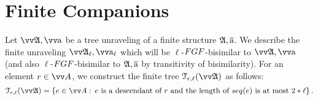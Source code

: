 
\section{Finite Companions}\label{sec:finite}
Let $\unravel{A}, \elemtuptuplea$ be a tree unraveling of a finite structure ${\mathfrak{A}}, \overline{\mathrm{a}}$.
We describe the finite unraveling $\unravel{A}_{\ell}, \elemtuptuplea_{\ell}$ which will be $\ell$-$\FGF$-bisimilar to $\unravel{A}, \elemtuptuplea$ (and also $\ell$-$\FGF$-bisimilar to ${\mathfrak{A}}, \overline{\mathrm{a}}$ by transitivity of bisimilarity).
For an element $r \in \unraveldom{A}$, we construct the finite tree $\mathcal{T}_{r,\ell}(\unravel{A})$ as follows:
\begin{equation*}
  \mathcal{T}_{r,\ell}(\unravel{A}) = \left\{ e \in \unraveldom{A}:\, e\ \text{is a descendant of $r$ and the length of $\seq{e}$ is at most $2 * \ell$} \right\}.
\end{equation*}

